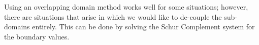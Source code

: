 Using an overlapping domain method works well for some situations; however, there are situations that arise in which we would like to de-couple the sub-domains entirely. This can be done by solving the Schur Complement system for the boundary values.